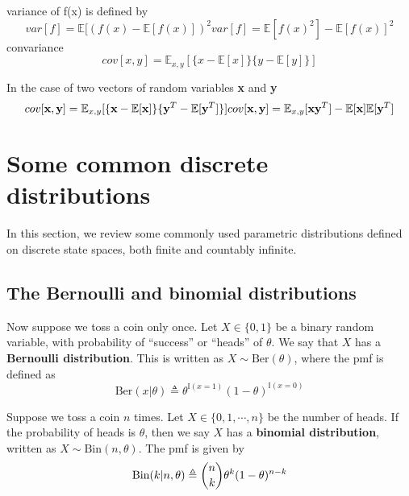 variance of f(x) is defined by
\begin{equation}
var[f] = \mathbb{E}[(f(x) - \mathbb{E}[f(x)])^2
var[f] = \mathbb{E}[f(x)^2]-\mathbb{E}[f(x)]^2
\end{equation}
convariance 
\begin{equation}
cov[x,y] = \mathbb{E}_{x,y}[\{x- \mathbb{E}[x]\}\{y-\mathbb{E}[y]\}]
\end{equation}

In the case of two vectors of random variables \textbf{x} and \textbf{y}
\begin{equation}
cov[\textbf{x},\textbf{y}] = \mathbb{E}_{x,y}[\{\textbf{x}-\mathbb{E}[\textbf{x}]\} \{ \textbf{y}^T - \mathbb{E}[\textbf{y}^T ]\}] \\
cov[\textbf{x},\textbf{y}] = \mathbb{E}_{x,y}[\textbf{x}\textbf{y}^T] - \mathbb{E}[\textbf{x}] \mathbb{E}[\textbf{y}^T]
\end{equation}

\section{Some common discrete distributions}
In this section, we review some commonly used parametric distributions defined on discrete state spaces, both finite and countably infinite.


\subsection{The Bernoulli and binomial distributions}

\begin{definition}
Now suppose we toss a coin only once. Let $X \in \{0,1\}$ be a binary random variable, with probability of “success” or “heads” of $\theta$. We say that $X$ has a \textbf{Bernoulli distribution}. This is written as $X \sim \text{Ber}(\theta)$, where the pmf is defined as 
\begin{equation}
\text{Ber}(x|\theta) \triangleq \theta^{\mathbb{I}(x=1)}(1-\theta)^{\mathbb{I}(x=0)}
\end{equation}
\end{definition}


\begin{definition}
Suppose we toss a coin $n$ times. Let $X \in \{0,1,\cdots,n\}$ be the number of heads. If the probability of heads is $\theta$, then we say $X$ has a \textbf{binomial distribution}, written as $X \sim \text{Bin}(n, \theta)$. The pmf is given by 
\begin{equation}\label{eqn:binomial-pmf}
\text{Bin}(k|n,\theta) \triangleq \dbinom{n}{k}\theta^k(1-\theta)^{n-k}
\end{equation}
\end{definition}


